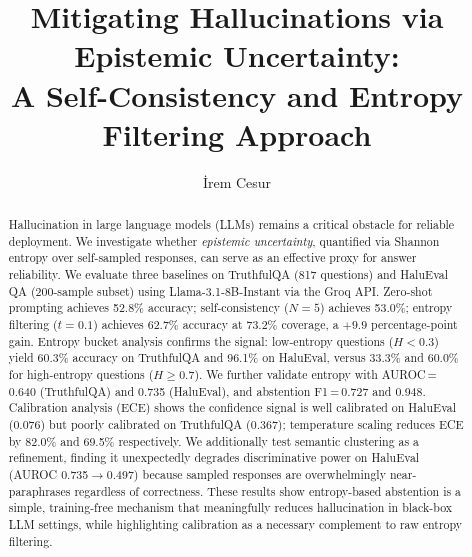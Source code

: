 \documentclass{llncs}
\begin{document}
\title{Mitigating Hallucinations via Epistemic Uncertainty:\\
A Self-Consistency and Entropy Filtering Approach}

\author{İrem Cesur}


\maketitle

\begin{abstract}
Hallucination in large language models (LLMs) remains a critical obstacle for
reliable deployment. We investigate whether \emph{epistemic uncertainty},
quantified via Shannon entropy over self-sampled responses, can serve as an
effective proxy for answer reliability. We evaluate three baselines on
TruthfulQA (817 questions) and HaluEval QA (200-sample subset) using
Llama-3.1-8B-Instant via the Groq API. Zero-shot prompting achieves 52.8\%
accuracy; self-consistency ($N{=}5$) achieves 53.0\%; entropy filtering
($t{=}0.1$) achieves 62.7\% accuracy at 73.2\% coverage, a $+9.9$
percentage-point gain. Entropy bucket analysis confirms the signal:
low-entropy questions ($H{<}0.3$) yield 60.3\% accuracy on TruthfulQA and
96.1\% on HaluEval, versus 33.3\% and 60.0\% for high-entropy questions
($H{\geq}0.7$). We further validate entropy with AUROC\,=\,0.640
(TruthfulQA) and 0.735 (HaluEval), and abstention F1\,=\,0.727 and 0.948.
Calibration analysis (ECE) shows the confidence signal is well calibrated on
HaluEval (0.076) but poorly calibrated on TruthfulQA (0.367); temperature
scaling reduces ECE by 82.0\% and 69.5\% respectively. We additionally test
semantic clustering as a refinement, finding it unexpectedly degrades
discriminative power on HaluEval (AUROC 0.735$\to$0.497) because sampled
responses are overwhelmingly near-paraphrases regardless of correctness.
These results show entropy-based abstention is a simple, training-free
mechanism that meaningfully reduces hallucination in black-box LLM settings,
while highlighting calibration as a necessary complement to raw entropy
filtering.
\end{abstract}
\end{document}
